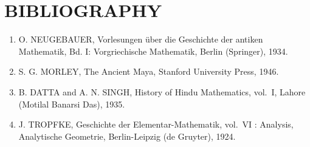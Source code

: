 \section*{BIBLIOGRAPHY}
{}

\begin{enumerate}
\def\labelenumi{\arabic{enumi}.}
\item
  O. NEUGEBAUER, Vorlesungen über die Geschichte der antiken Mathematik, Bd. I: Vorgriechische Mathematik, Berlin (Springer), 1934.
\item
  S. G. MORLEY, The Ancient Maya, Stanford University Press, 1946.
\item
  B. DATTA and A. N. SINGH, History of Hindu Mathematics, vol.~I, Lahore (Motilal Banarsi Das), 1935.
\item
  J. TROPFKE, Geschichte der Elementar-Mathematik, vol.~VI : Analysis, Analytische Geometrie, Berlin-Leipzig (de Gruyter), 1924.
\end{enumerate}
